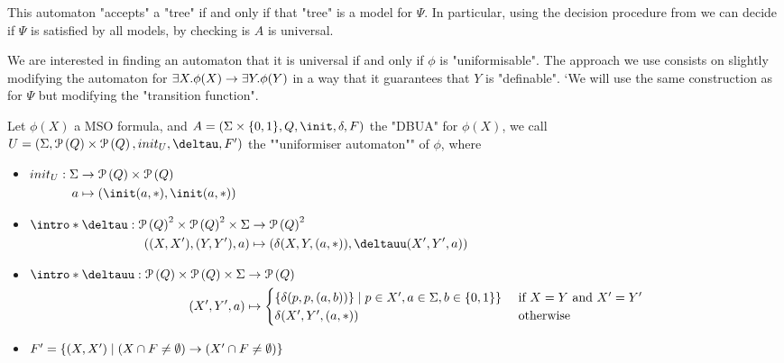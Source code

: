 \documentclass[a4paper,UKenglish,cleveref, autoref, thm-restate]{lipics-v2021}
\begin{document}
This automaton "accepts" a "tree" if and only if that "tree" is a model for $\Psi$. In particular, using the decision procedure
from  we can decide if $\Psi$ is satisfied by all models, by checking  is $A$ is universal.

We are interested in finding an automaton that it is universal if and only if $\phi$ is "uniformisable". The approach we use consists on slightly modifying
the automaton for $\exists X. \phi(X) \rightarrow \exists Y. \phi (Y)$ in a way that it guarantees that $Y$ is "definable".
`We will use the same construction as for $\Psi$ but modifying the "transition function".

\begin{definition}
	Let $\phi(X)$ a MSO formula, and $A =  (\Sigma \times \{0,1\}, Q, \init, \delta, F)$ the "DBUA" for $\phi(X)$, we call $U = (\Sigma, \parts Q \times \parts Q,init_U, \deltau, F')$
	the ""uniformiser automaton"" of $\phi$, where
	\begin{itemize}
		\item$\begin{aligned}[t]
				      init_U : \Sigma & \to      \parts Q \times \parts {Q} \\
				      a               & \mapsto  ( \init(a,*), \init(a,*))
			      \end{aligned}$
		\item$\begin{aligned}[t]
				      \intro*\deltau : {\parts Q}^2 \times {\parts {Q}}^2 \times \Sigma & \to    {\parts {Q}}^2                           \\
				      ((X,X'),(Y,Y'),a)                                                 & \mapsto (\delta(X,Y,(a,*)), \deltauu (X',Y',a)) \\
			      \end{aligned}$
		\item $ \begin{aligned}[t]
				      \intro*\deltauu : \parts Q \times \parts Q \times \Sigma & \to \parts Q                                                                                                               \\
				      (X', Y', a)                                              & \mapsto \begin{cases}
					                                                                         \{\delta(p,p,(a,b))\}     \mid p \in X', a \in \Sigma, b \in \set{0,1}\} & \text{ if }  X = Y \text{ and } X' = Y' \\
					                                                                         \delta(X',Y',(a,*))                                                      & \text{ otherwise}
				                                                                         \end{cases}
			      \end{aligned}$
		\item $F' = \left\{(X,X') \mid (X \cap F \neq \emptyset) \rightarrow (X' \cap F \neq \emptyset)\right\}$
	\end{itemize}
\end{definition}
\end{document}
